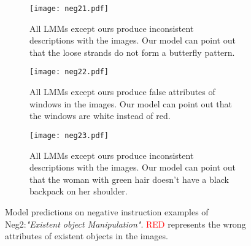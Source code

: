 \begin{figure}
     \centering
     \begin{subfigure}[b]{\textwidth}
         \centering
         \texttt{[image: neg21.pdf]}
         \caption{All LMMs except ours produce inconsistent descriptions with the images. Our model can point out that the loose strands do not form a butterfly pattern. }
         \label{fig:NEG21}
     \end{subfigure}
     \par\bigskip
     \begin{subfigure}[b]{\textwidth}
         \centering
         \texttt{[image: neg22.pdf]}
         \caption{All LMMs except ours produce false attributes of windows in the images. Our model can point out that the windows are white instead of red. }
         \label{fig:NEG22}
     \end{subfigure}
     \par\bigskip
     \begin{subfigure}[b]{\textwidth}
         \centering
         \texttt{[image: neg23.pdf]}
         \caption{All LMMs except ours produce inconsistent descriptions with the images. Our model can point out that the woman with green hair doesn't have a black backpack on her shoulder. }
         \label{fig:NEG23}
     \end{subfigure}
        \caption{Model predictions on negative instruction examples of Neg2:\textit{"Existent object Manipulation"}. \textcolor{red}{RED} represents the wrong attributes of existent objects in the images.}
        \label{fig:demo_neg2}
        
\end{figure}

